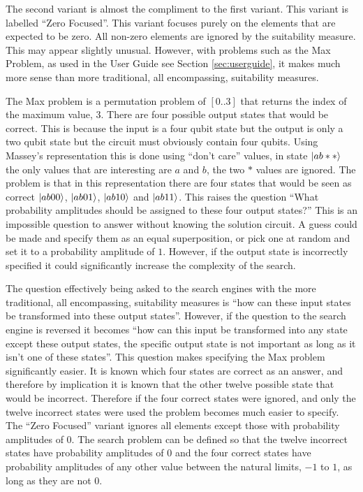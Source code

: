 The second variant is almost the compliment to the first variant.
This variant is labelled ``Zero Focused''.
This variant focuses purely on the elements that are expected to be zero.
All non-zero elements are ignored by the suitability measure.
This may appear slightly unusual.
However, with problems such as the Max Problem, as used in the User Guide see Section \ref{sec:userguide}, it makes much more sense than more traditional, all encompassing, suitability measures.

The Max problem is a permutation problem of $[0..3]$ that returns the index of the maximum value, $3$.
There are four possible output states that would be correct.
This is because the input is a four qubit state but the output is only a two qubit state but the circuit must obviously contain four qubits.
Using Massey's\cite{masseythesis} representation this is done using ``don't care'' values, in state $\left\vert{ab**}\right\rangle$ the only values that are interesting are $a$ and $b$, the two $*$ values are ignored.
The problem is that in this representation there are four states that would be seen as correct $\left\vert{ab00}\right\rangle$, $\left\vert{ab01}\right\rangle$, $\left\vert{ab10}\right\rangle$ and $\left\vert{ab11}\right\rangle$.
This raises the question ``What probability amplitudes should be assigned to these four output states?''
This is an impossible question to answer without knowing the solution circuit.
A guess could be made and specify them as an equal superposition, or pick one at random and set it to a probability amplitude of $1$.
However, if the output state is incorrectly specified it could significantly increase the complexity of the search.

The question effectively being asked to the search engines with the more traditional, all encompassing, suitability measures is ``how can these input states be transformed into these output states''.
However, if the question to the search engine is reversed it becomes ``how can this input be transformed into any state except these output states, the specific output state is not important as long as it isn't one of these states''.
This question makes specifying the Max problem significantly easier.
It is known which four states are correct as an answer, and therefore by implication it is known that the other twelve possible state that would be incorrect.
Therefore if the four correct states were ignored, and only the twelve incorrect states were used the problem becomes much easier to specify.
The ``Zero Focused'' variant ignores all elements except those with probability amplitudes of $0$.
The search problem can be defined so that the twelve incorrect states have probability amplitudes of $0$ and the four correct states have probability amplitudes of any other value between the natural limits, $-1$ to $1$, as long as they are not $0$.

